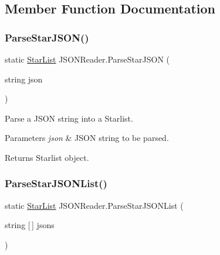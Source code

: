 \subsection{Member Function Documentation}
\mbox{\label{class_j_s_o_n_reader_ae385710fbe5cd84513a4282b6465ed36}} 
\subsubsection{\texorpdfstring{ParseStarJSON()}{ParseStarJSON()}}
{\footnotesize\ttfamily static \mbox{\hyperlink{class_star_list}{Star\+List}} J\+S\+O\+N\+Reader.\+Parse\+Star\+J\+S\+ON (\begin{DoxyParamCaption}\item[{string}]{json }\end{DoxyParamCaption})\hspace{0.3cm}{\ttfamily [static]}}



Parse a J\+S\+ON string into a Starlist. 


\begin{DoxyParams}{Parameters}
{\em json} & J\+S\+ON string to be parsed.\\
\hline
\end{DoxyParams}
\begin{DoxyReturn}{Returns}
Starlist object.
\end{DoxyReturn}
\mbox{\label{class_j_s_o_n_reader_aa67d1a5e3aba0b5202776571eacc2062}} 
\subsubsection{\texorpdfstring{ParseStarJSONList()}{ParseStarJSONList()}}
{\footnotesize\ttfamily static \mbox{\hyperlink{class_star_list}{Star\+List}} J\+S\+O\+N\+Reader.\+Parse\+Star\+J\+S\+O\+N\+List (\begin{DoxyParamCaption}\item[{string \mbox{[}$\,$\mbox{]}}]{jsons }\end{DoxyParamCaption})\hspace{0.3cm}{\ttfamily [static]}}



